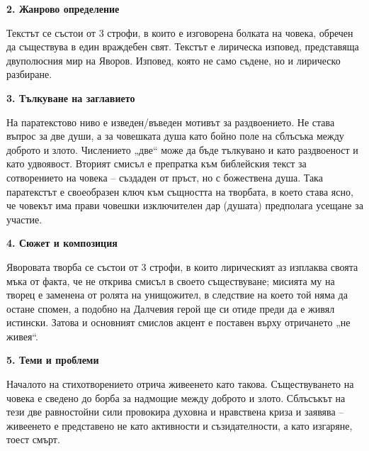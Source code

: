 \documentclass[12pt,a4paper]{article}
\begin{document}
\vspace{0.1cm}
\textbf{2. Жанрово определение}
\vspace{0.1cm}

\indent Текстът се състои от 3 строфи, в които е изговорена болката на човека, обречен да съществува в един враждебен свят. Текстът е лирическа изповед, представяща двуполюсния мир на Яворов. Изповед, която не само съдене, но и лирическо разбиране.

\vspace{0.1cm}
\textbf{3. Тълкуване на заглавието}
\vspace{0.1cm}

\indent На паратекстово ниво е изведен/въведен мотивът за раздвоението. Не става въпрос за две души, а за човешката душа като бойно поле на сблъсъка между доброто и злото. Числението „две“ може да бъде тълкувано и като раздвоеност и като удвоявост. Вторият смисъл е препратка към библейския текст за сотворението на човека – създаден от пръст, но с божествена душа. Така паратекстът е своеобразен ключ към същността на творбата, в което става ясно, че човекът има прави човешки изключителен дар (душата) предполага усещане за участие.

\vspace{0.1cm}
\textbf{4. Сюжет и композиция}
\vspace{0.1cm}

\indent Яворовата творба се състои от 3 строфи, в които лирическият аз изплаква своята мъка от факта, че не открива смисъл в своето съществуване; мисията му на творец е заменена от ролята на унищожител, в следствие на което той няма да остане спомен, а подобно на Далчевия герой ще си отиде преди да е живял истински. Затова и основният смислов акцент е поставен върху отричането „не живея“.

\vspace{0.1cm}
\textbf{5. Теми и проблеми}
\vspace{0.1cm}

\indent Началото на стихотворението отрича живеенето като такова. Съществуването на човека е сведено до борба за надмощие между доброто и злото. Сблъсъкът на тези две равностойни сили провокира духовна и нравствена криза и заявява – живеенето е представено не като активности и съзидателности, а като изгаряне, тоест смърт.
\end{document}
